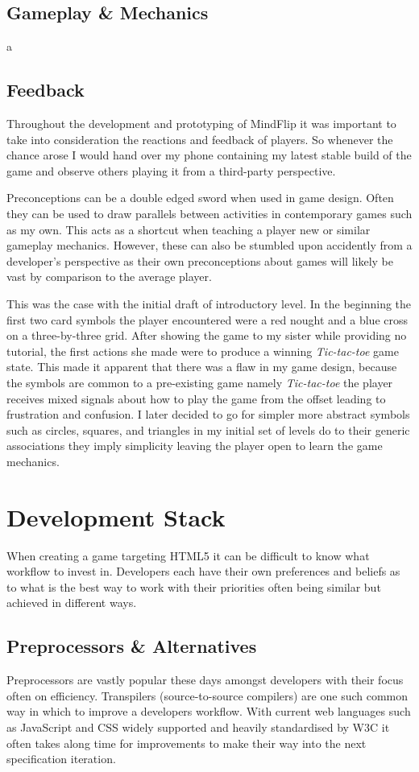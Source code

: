 \documentclass[final]{cmpreport}
\begin{document}
\subsection{Gameplay \& Mechanics}
a

\subsection{Feedback}
Throughout the development and prototyping of MindFlip it was important to take into consideration the reactions and feedback of players. So whenever the chance arose I would hand over my phone containing my latest stable build of the game and observe others playing it from a third-party perspective.

Preconceptions can be a double edged sword when used in game design. Often they can be used to draw parallels between activities in contemporary games such as my own. This acts as a shortcut when teaching a player new or similar gameplay mechanics. However, these can also be stumbled upon accidently from a developer's perspective as their own preconceptions about games will likely be vast by comparison to the average player.

This was the case with the initial draft of introductory level. In the beginning the first two card symbols the player encountered were a red nought and a blue cross on a three-by-three grid. After showing the game to my sister while providing no tutorial, the first actions she made were to produce a winning \emph{Tic-tac-toe} game state. This made it apparent that there was a flaw in my game design, because the symbols are common to a pre-existing game namely \emph{Tic-tac-toe} the player receives mixed signals about how to play the game from the offset leading to frustration and confusion. I later decided to go for simpler more abstract symbols such as circles, squares, and triangles in my initial set of levels do to their generic associations they imply simplicity leaving the player open to learn the game mechanics.

\section{Development Stack}
When creating a game targeting HTML5 it can be difficult to know what workflow to invest in. Developers each have their own preferences and beliefs as to what is the best way to work with their priorities often being similar but achieved in different ways.

\subsection{Preprocessors \& Alternatives}
Preprocessors are vastly popular these days amongst developers with their focus often on efficiency. Transpilers (source-to-source compilers) are one such common way in which to improve a developers workflow. With current web languages such as JavaScript and CSS widely supported and heavily standardised by W3C it often takes along time for improvements to make their way into the next specification iteration.
\end{document}
